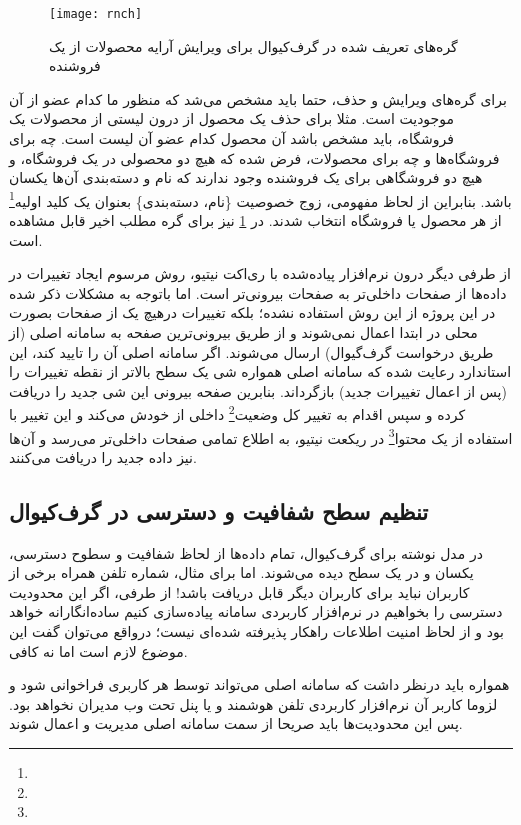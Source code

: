 \begin{figure}[H]
	\centering
	\texttt{[image: rnch]}
	\caption{گره‌های تعریف شده در گرف‌کیوال برای ویرایش آرایه محصولات از یک فروشنده}
	\label{fig:rnch}
\end{figure}

برای گره‌های ویرایش و حذف، حتما باید مشخص می‌شد که منظور ما کدام عضو از آن موجودیت است. مثلا برای حذف یک محصول از درون لیستی از محصولات یک فروشگاه، باید مشخص باشد آن محصول کدام عضو آن لیست است. چه برای فروشگاه‌ها و چه برای محصولات، فرض شده که هیچ دو محصولی در یک فروشگاه، و هیچ دو فروشگاهی برای یک فروشنده وجود ندارند که نام و دسته‌بندی آن‌ها یکسان باشد. بنابراین از لحاظ مفهومی، زوج خصوصیت \{نام، دسته‌بندی\} بعنوان یک کلید اولیه\footnote{} از هر محصول یا فروشگاه انتخاب شدند. در \cref{fig:rnch} نیز برای گره  مطلب اخیر قابل مشاهده است.

از طرفی دیگر درون نرم‌افزار پیاده‌شده با ری‌اکت نیتیو، روش مرسوم ایجاد تغییرات در داده‌ها از صفحات داخلی‌تر به صفحات بیرونی‌تر است. اما باتوجه به مشکلات ذکر شده در این پروژه از این روش استفاده نشده؛ بلکه تغییرات درهیچ یک از صفحات بصورت محلی در ابتدا اعمال نمی‌شوند و از طریق بیرونی‌ترین صفحه به سامانه اصلی (از طریق درخواست گرف‌گیوال) ارسال می‌شوند. اگر سامانه اصلی آن را تایید کند، این استاندارد رعایت شده که سامانه اصلی همواره شی یک سطح بالاتر از نقطه تغییرات را (پس از اعمال تغییرات جدید) بازگرداند. بنابرین صفحه بیرونی این شی جدید را دریافت کرده و سپس اقدام به تغییر کل وضعیت\footnote{} داخلی از خودش می‌کند و این تغییر با استفاده از یک محتوا\footnote{} در ریکعت نیتیو، به اطلاع تمامی صفحات داخلی‌تر می‌رسد و آن‌ها نیز داده جدید را دریافت می‌کنند\cite{react:hooks}.

\subsection{تنظیم سطح شفافیت و دسترسی در گرف‌کیوال}

در مدل نوشته برای گرف‌کیوال، تمام داده‌ها از لحاظ شفافیت و سطوح دسترسی، یکسان و در یک سطح دیده می‌شوند. اما برای مثال، شماره تلفن همراه برخی از کاربران نباید برای کاربران دیگر قابل دریافت باشد! از طرفی،‌ اگر این محدودیت دسترسی را بخواهیم در نرم‌افزار کاربردی سامانه پیاده‌سازی کنیم ساده‌انگارانه خواهد بود و از لحاظ امنیت اطلاعات راهکار پذیرفته شده‌ای نیست؛ درواقع می‌توان گفت این موضوع لازم است اما نه کافی.

همواره باید درنظر داشت که سامانه اصلی می‌تواند توسط هر کاربری فراخوانی شود و لزوما کاربر آن نرم‌افزار کاربردی تلفن هوشمند و یا پنل تحت وب مدیران نخواهد بود. پس این محدودیت‌ها باید صریحا از سمت سامانه اصلی مدیریت و اعمال شوند.

